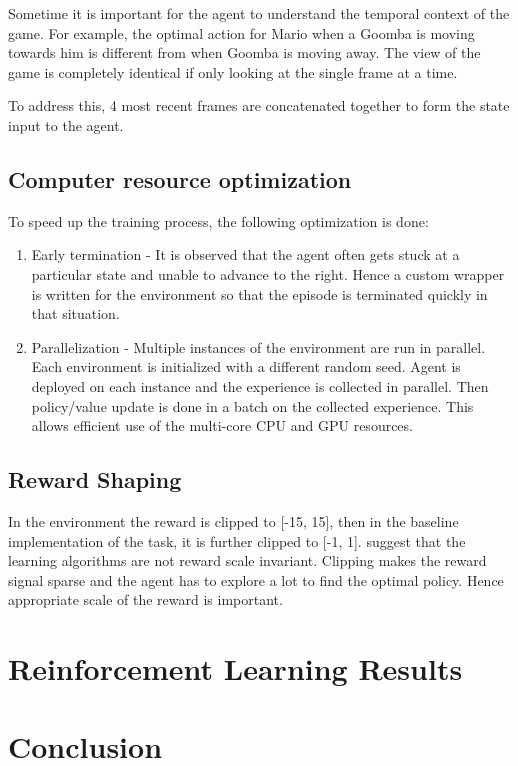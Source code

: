 \documentclass[conference]{IEEEtran}
\begin{document}
Sometime it is important for the agent to understand the temporal context of the game. For example, the optimal action for Mario when a Goomba is moving towards him is different from when Goomba is moving away. The view of the game is completely identical if only looking at the single frame at a time.

To address this, 4 most recent frames are concatenated together to form the state input to the agent.

\subsection{Computer resource optimization}

To speed up the training process, the following optimization is done:
\begin{enumerate}
    \item Early termination - It is observed that the agent often gets stuck at a particular state and unable to advance to the right. Hence a custom wrapper is written for the environment so that the episode is terminated quickly in that situation.
    \item Parallelization - Multiple instances of the environment are run in parallel. Each environment is initialized with a different random seed. Agent is deployed on each instance and the experience is collected in parallel. Then policy/value update is done in a batch on the collected experience. This allows efficient use of the multi-core CPU and GPU resources.
\end{enumerate}

\subsection{Reward Shaping}

In the environment the reward is clipped to [-15, 15], then in the baseline implementation of the task, it is further clipped to [-1, 1]. \cite{vanhasseltLearningValuesMany2016} suggest that the learning algorithms are not reward scale invariant. Clipping makes the reward signal sparse and the agent has to explore a lot to find the optimal policy. Hence appropriate scale of the reward is important.

\section{Reinforcement Learning Results}

\section{Conclusion}





\end{document}
